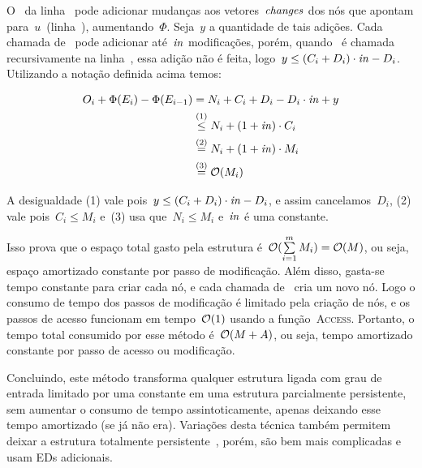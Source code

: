 \documentclass[../../main.tex]{subfiles}
\begin{document}
O~ da linha~ pode adicionar mudanças aos vetores~$\mathit{changes}$ dos nós que apontam para~$u$~(linha~), aumentando~$\Phi$. Seja~$y$ a quantidade de tais adições. Cada chamada de~\textsc{} pode adicionar até~$\mathit{in}$ modificações, porém, quando~\textsc{} é chamada recursivamente na linha~, essa adição não é feita, logo~$y \leq (C_i + D_i) \cdot \mathit{in} - D_i$. Utilizando a notação definida acima temos:

\begin{align*}
	O_i + \Phi(E_i) - \Phi(E_{i-1}) & = N_i + C_i + D_i - D_i \cdot \mathit{in} + y
	\\ &\stackrel{\text{(1)}}{\leq} N_i + (1 + \mathit{in})\cdot C_i
	\\ &\stackrel{\text{(2)}}{=} N_i + (1 + \mathit{in}) \cdot M_i
	\\ &\stackrel{\text{(3)}}{=} \mathcal{O}(M_i)
\end{align*}

A desigualdade (1) vale pois~$y \leq (C_i + D_i) \cdot \mathit{in} - D_i$, e assim cancelamos~$D_i$, (2) vale pois~$C_i \leq M_i$ e~(3) usa que~$N_i \leq M_i$ e~$\mathit{in}$ é uma constante.

Isso prova que o espaço total gasto pela estrutura é~${\mathcal{O}(\sum\limits_{i=1}^m{M_i}) = \mathcal{O}(M)}$, ou seja, espaço amortizado constante por passo de modificação. Além disso, gasta-se tempo constante para criar cada nó, e cada chamada de~\textsc{} cria um novo nó. Logo o consumo de tempo dos passos de modificação é limitado pela criação de nós, e os passos de acesso funcionam em tempo~$\mathcal{O}(1)$ usando a função~\textsc{Access}. Portanto, o tempo total consumido por esse método é~$\mathcal{O}(M+A)$, ou seja, tempo amortizado constante por passo de acesso ou modificação.

Concluindo, este método transforma qualquer estrutura ligada com grau de entrada limitado por uma constante em uma estrutura parcialmente persistente, sem aumentar o consumo de tempo assintoticamente, apenas deixando esse tempo amortizado (se já não era). Variações desta técnica também permitem deixar a estrutura totalmente persistente~\cite{DriscollSST1989}, porém, são bem mais complicadas e usam EDs adicionais.
\end{document}
